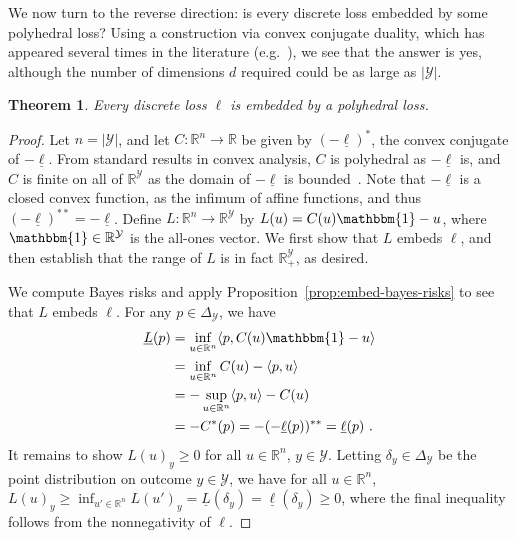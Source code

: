 \documentclass[12pt]{article}
\newcommand{\Comments}{1}
\newcommand{\mytodo}[2]{\ifnum\Comments=1%
  \todo[linecolor=#1!80!black,backgroundcolor=#1,bordercolor=#1!80!black]{#2}\fi}
\newcommand{\raft}[1]{\mytodo{green!20!white}{RF: #1}}
\newcommand{\btw}[1]{}%
\newcommand{\reals}{\mathbb{R}}
\newcommand{\simplex}{\Delta_\Y}
\newcommand{\Y}{\mathcal{Y}}
\newcommand{\risk}[1]{\underline{#1}}
\newcommand{\inprod}[2]{\langle #1, #2 \rangle}%
\newcommand{\ones}{\mathbbm{1}}
\newtheorem{theorem}{Theorem}
\begin{document}
We now turn to the reverse direction: is every discrete loss embedded by some polyhedral loss?
Using a construction via convex conjugate duality, which has appeared several times in the literature (e.g.\ \cite{duchi2018multiclass,abernethy2013efficient,frongillo2014general}), we see that the answer is yes, although the number of dimensions $d$ required could be as large as $|\Y|$.

\begin{theorem}\label{thm:discrete-loss-poly-embeddable}
  Every discrete loss $\ell$ is embedded by a polyhedral loss.
\end{theorem}
\begin{proof}
  Let $n = |\Y|$, and let $C:\reals^n \to \reals$ be given by $(-\risk{\ell})^*$, the convex conjugate of $-\risk{\ell}$.
  From standard results in convex analysis, $C$ is polyhedral as $-\risk{\ell}$ is, and $C$ is finite on all of $\reals^\Y$ as the domain of $-\risk{\ell}$ is bounded~\cite[Corollary 13.3.1]{rockafellar1997convex}.
  Note that $-\risk{\ell}$ is a closed convex function, as the infimum of affine functions, and thus $(-\risk{\ell})^{**} = -\risk{\ell}$.
  Define $L:\reals^n\to\reals^\Y$ by $L(u) = C(u)\ones - u$, where $\ones\in\reals^\Y$ is the all-ones vector.
  We first show that $L$ embeds $\ell$, and then establish that the range of $L$ is in fact $\reals^\Y_+$, as desired.

  We compute Bayes risks and apply Proposition~\ref{prop:embed-bayes-risks} to see that $L$ embeds $\ell$.
  For any $p\in\simplex$, we have
  \begin{align*}
    \risk{L}(p)
    &= \inf_{u\in\reals^n} \inprod{p}{C(u)\ones - u}
    \\
    &= \inf_{u\in\reals^n} C(u) - \inprod{p}{u}
    \\
    &= -\sup_{u\in\reals^n} \inprod{p}{u} - C(u)
    \\
    &= -C^*(p) = - (-\risk{\ell}(p))^{**} = \risk{\ell}(p)~.
  \end{align*}
  It remains to show $L(u)_y \geq 0$ for all $u\in\reals^n$, $y\in\Y$.
  Letting $\delta_y\in\simplex$ be the point distribution on outcome $y\in\Y$, we have for all $u\in\reals^n$, $L(u)_y \geq \inf_{u'\in\reals^n} L(u')_y = \risk{L}(\delta_y) = \risk{\ell}(\delta_y) \geq 0$, where the final inequality follows from the nonnegativity of $\ell$.
  \btw{FUTURE: to get $n-1$, just use the same trick as before and note that the Bayes risk doesn't change.  Should be a couple lines.  (Not needed for NeurIPS since we don't focus on the dimension.)}
\end{proof}
\end{document}
